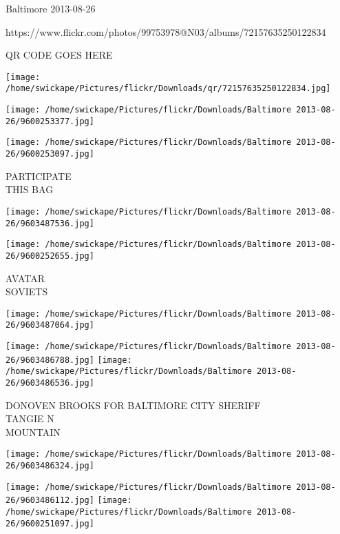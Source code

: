 \documentclass[10pt,letterpaper]{article}
\begin{document}
Baltimore 2013-08-26

https://www.flickr.com/photos/99753978@N03/albums/72157635250122834

QR CODE GOES HERE

\texttt{[image: /home/swickape/Pictures/flickr/Downloads/qr/72157635250122834.jpg]}
\pagebreak

\texttt{[image: /home/swickape/Pictures/flickr/Downloads/Baltimore 2013-08-26/9600253377.jpg]}

\vspace{0.25in}
\texttt{[image: /home/swickape/Pictures/flickr/Downloads/Baltimore 2013-08-26/9600253097.jpg]}

PARTICIPATE\\
THIS BAG\\
\pagebreak

\texttt{[image: /home/swickape/Pictures/flickr/Downloads/Baltimore 2013-08-26/9603487536.jpg]}

\vspace{0.25in}
\texttt{[image: /home/swickape/Pictures/flickr/Downloads/Baltimore 2013-08-26/9600252655.jpg]}

AVATAR\\
SOVIETS\\
\pagebreak

\texttt{[image: /home/swickape/Pictures/flickr/Downloads/Baltimore 2013-08-26/9603487064.jpg]}

\vspace{0.25in}
\texttt{[image: /home/swickape/Pictures/flickr/Downloads/Baltimore 2013-08-26/9603486788.jpg]}
\texttt{[image: /home/swickape/Pictures/flickr/Downloads/Baltimore 2013-08-26/9603486536.jpg]}

DONOVEN BROOKS FOR BALTIMORE CITY SHERIFF\\
TANGIE N\\
MOUNTAIN\\
\pagebreak

\texttt{[image: /home/swickape/Pictures/flickr/Downloads/Baltimore 2013-08-26/9603486324.jpg]}

\vspace{0.25in}
\texttt{[image: /home/swickape/Pictures/flickr/Downloads/Baltimore 2013-08-26/9603486112.jpg]}
\texttt{[image: /home/swickape/Pictures/flickr/Downloads/Baltimore 2013-08-26/9600251097.jpg]}
\end{document}
